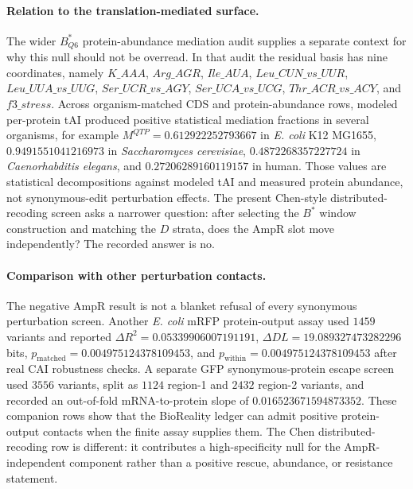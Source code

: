 \paragraph{Relation to the translation-mediated surface.}
The wider $B^\ast_{Q6}$ protein-abundance mediation audit supplies a separate context for why this null should not be overread.  In that audit the residual basis has nine coordinates, namely $K\_AAA$, $Arg\_AGR$, $Ile\_AUA$, $Leu\_CUN\_vs\_UUR$, $Leu\_UUA\_vs\_UUG$, $Ser\_UCR\_vs\_AGY$, $Ser\_UCA\_vs\_UCG$, $Thr\_ACR\_vs\_ACY$, and $f3\_stress$.  Across organism-matched CDS and protein-abundance rows, modeled per-protein tAI produced positive statistical mediation fractions in several organisms, for example $M^{QTP}=0.612922252793667$ in \emph{E. coli} K12 MG1655, $0.9491551041216973$ in \emph{Saccharomyces cerevisiae}, $0.4872268357227724$ in \emph{Caenorhabditis elegans}, and $0.27206289160119157$ in human.  Those values are statistical decompositions against modeled tAI and measured protein abundance, not synonymous-edit perturbation effects.  The present Chen-style distributed-recoding screen asks a narrower question: after selecting the $B^\ast$ window construction and matching the $D$ strata, does the AmpR slot move independently?  The recorded answer is no.

\paragraph{Comparison with other perturbation contacts.}
The negative AmpR result is not a blanket refusal of every synonymous perturbation screen.  Another \emph{E. coli} mRFP protein-output assay used $1459$ variants and reported $\Delta R^2=0.05339906007191191$, $\Delta DL=19.089327473282296$ bits, $p_{\mathrm{matched}}=0.004975124378109453$, and $p_{\mathrm{within}}=0.004975124378109453$ after real CAI robustness checks.  A separate GFP synonymous-protein escape screen used $3556$ variants, split as $1124$ region-1 and $2432$ region-2 variants, and recorded an out-of-fold mRNA-to-protein slope of $0.016523671594873352$.  These companion rows show that the BioReality ledger can admit positive protein-output contacts when the finite assay supplies them.  The Chen distributed-recoding row is different: it contributes a high-specificity null for the AmpR-independent component rather than a positive rescue, abundance, or resistance statement.

